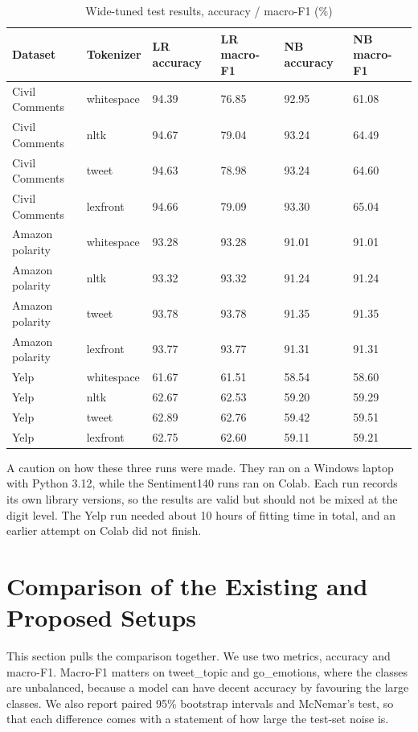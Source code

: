 \documentclass{ieeeaccess}
\begin{document}
\begin{table}[!tb]
\caption{Wide-tuned test results, accuracy / macro-F1 (\%)}\label{tab:12}
\centering
\scriptsize
\setlength{\tabcolsep}{3pt}
\begin{tabular}{llllll}
\toprule
\textbf{Dataset} & \textbf{Tokenizer} & \textbf{LR accuracy} & \textbf{LR macro-F1} & \textbf{NB accuracy} & \textbf{NB macro-F1} \\
\midrule
Civil Comments & whitespace & 94.39 & 76.85 & 92.95 & 61.08 \\
Civil Comments & nltk & 94.67 & 79.04 & 93.24 & 64.49 \\
Civil Comments & tweet & 94.63 & 78.98 & 93.24 & 64.60 \\
Civil Comments & lexfront & 94.66 & 79.09 & 93.30 & 65.04 \\
Amazon polarity & whitespace & 93.28 & 93.28 & 91.01 & 91.01 \\
Amazon polarity & nltk & 93.32 & 93.32 & 91.24 & 91.24 \\
Amazon polarity & tweet & 93.78 & 93.78 & 91.35 & 91.35 \\
Amazon polarity & lexfront & 93.77 & 93.77 & 91.31 & 91.31 \\
Yelp & whitespace & 61.67 & 61.51 & 58.54 & 58.60 \\
Yelp & nltk & 62.67 & 62.53 & 59.20 & 59.29 \\
Yelp & tweet & 62.89 & 62.76 & 59.42 & 59.51 \\
Yelp & lexfront & 62.75 & 62.60 & 59.11 & 59.21 \\
\bottomrule
\end{tabular}
\end{table}

A caution on how these three runs were made. They ran on a Windows laptop with Python 3.12, while the Sentiment140 runs ran on Colab. Each run records its own library versions, so the results are valid but should not be mixed at the digit level. The Yelp run needed about 10 hours of fitting time in total, and an earlier attempt on Colab did not finish.

\section{Comparison of the Existing and Proposed Setups}\label{sec:5}
This section pulls the comparison together. We use two metrics, accuracy and macro-F1. Macro-F1 matters on tweet\_topic and go\_emotions, where the classes are unbalanced, because a model can have decent accuracy by favouring the large classes. We also report paired 95\% bootstrap intervals and McNemar's test, so that each difference comes with a statement of how large the test-set noise is.
\end{document}
